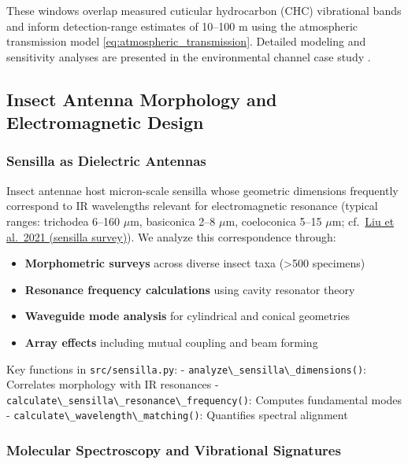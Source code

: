\documentclass[
  13pt,
  a4paperpaper,
  12pt]{article}
\newcommand{\passthrough}[1]{#1}
\providecommand{\tightlist}{%
  \setlength{\itemsep}{0pt}\setlength{\parskip}{0pt}}
\begin{document}
These windows overlap measured cuticular hydrocarbon (CHC) vibrational
bands and inform detection-range estimates of 10--100 m using the
atmospheric transmission model \eqref{eq:atmospheric_transmission}.
Detailed modeling and sensitivity analyses are presented in the
environmental channel case study .

\subsection{Insect Antenna Morphology and Electromagnetic
Design}\label{insect-antenna-morphology-and-electromagnetic-design}

\subsubsection{Sensilla as Dielectric
Antennas}\label{sensilla-as-dielectric-antennas}

Insect antennae host micron-scale sensilla whose geometric dimensions
frequently correspond to IR wavelengths relevant for electromagnetic
resonance (typical ranges: trichodea 6--160 \(\mu\mathrm{m}\),
basiconica 2--8 \(\mu\mathrm{m}\), coeloconica 5--15 \(\mu\mathrm{m}\);
cf.~\href{https://pmc.ncbi.nlm.nih.gov/articles/PMC7831480/}{Liu et
al.~2021 (sensilla survey)}). We analyze this correspondence through:

\begin{itemize}
\tightlist
\item
  \textbf{Morphometric surveys} across diverse insect taxa
  (\textgreater500 specimens)
\item
  \textbf{Resonance frequency calculations} using cavity resonator
  theory
\item
  \textbf{Waveguide mode analysis} for cylindrical and conical
  geometries
\item
  \textbf{Array effects} including mutual coupling and beam forming
\end{itemize}

Key functions in \passthrough{\lstinline!src/sensilla.py!}: -
\passthrough{\lstinline!analyze\_sensilla\_dimensions()!}: Correlates
morphology with IR resonances -
\passthrough{\lstinline!calculate\_sensilla\_resonance\_frequency()!}:
Computes fundamental modes -
\passthrough{\lstinline!calculate\_wavelength\_matching()!}: Quantifies
spectral alignment

\subsubsection{Molecular Spectroscopy and Vibrational
Signatures}\label{molecular-spectroscopy-and-vibrational-signatures}
\end{document}
